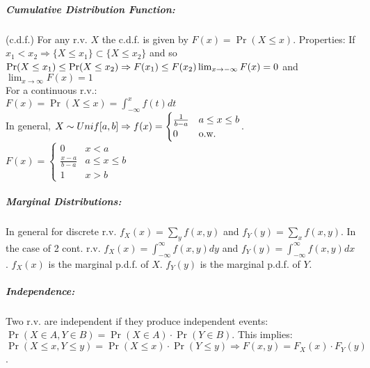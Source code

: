 \documentclass[landscape,10pt]{article}
\begin{document}
\begin{multicols}{4}
    \subparagraph*{Cumulative Distribution Function: } 
        (c.d.f.) For any r.v. \(X\) the c.d.f. is given by \(F(x) = \Pr(X \leq x)\). Properties: 
        If \(x_1 < x_2 \Rightarrow \{X \leq x_1 \} \subset \{X \leq x_2 \}\) and so \(\Pr(X \leq x_1) \leq \Pr(X \leq x_2) \Rightarrow F(x_1) \leq F(x_2) \\
        \lim_{x \to -\infty} F(x) = 0\) and \(\lim_{x \to \infty} F(x) = 1\)\\
        For a continuous r.v.: \\\(F(x) = \Pr(X \leq x) = \int_{-\infty}^{x}f(t)dt\) \\ 
    In general, \(X \sim Unif[a,b] \Rightarrow \\f(x) = \begin{cases} \frac{1}{b-a} & a \leq x \leq b \\ 0 & \text{o.w.} \end{cases}\). 
    \\\(F(x) = \begin{cases} 0 & x < a \\ \frac{x-a}{b-a} & a \leq x \leq b \\ 1 & x > b \end{cases}\)



    \subparagraph*{Marginal Distributions: }
        In general for discrete r.v. \(f_X(x) = \sum_{y}f(x,y)\) and \(f_Y(y) = \sum_{x}f(x,y)\). In the case of 2 cont. r.v. \(f_X(x) = \int_{-\infty}^{\infty}f(x,y)dy\) and \(f_Y(y) = \int_{-\infty}^{\infty}f(x,y)dx\). \(f_X(x)\) is the marginal p.d.f. of \(X\). \(f_Y(y)\) is the marginal p.d.f. of \(Y\).

    \subparagraph*{Independence: }
        Two r.v. are independent if they produce independent events: \(\Pr(X \in A, Y \in B) = \Pr(X \in A) \cdot \Pr(Y \in B)\). This implies: \(\Pr(X \leq x, Y \leq y) = \Pr(X \leq x) \cdot \Pr(Y \leq y) \Rightarrow F(x,y) = F_X(x) \cdot F_Y(y)\).


\end{multicols}
\end{document}

